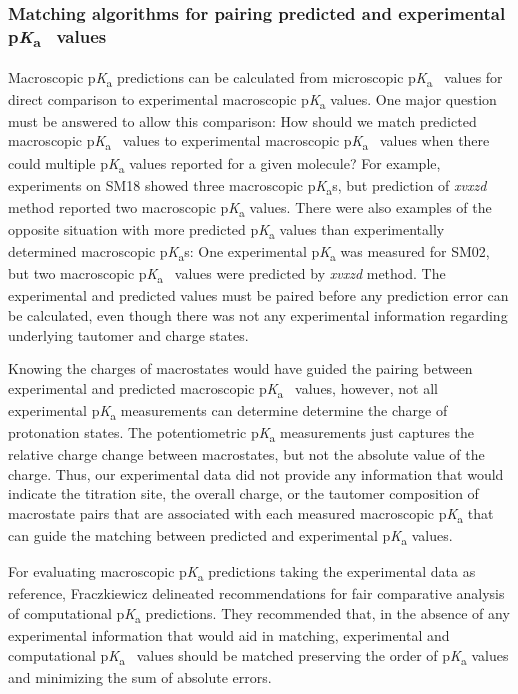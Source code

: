 \documentclass[9pt,lineno,final]{elife}
\newcommand{\pKa}{p\textit{K}\textsubscript{a}}
\begin{document}
\subsubsection{Matching algorithms for pairing predicted and experimental \pKa{}~ values}

Macroscopic \pKa{} predictions can be calculated from microscopic \pKa{}~ values for direct comparison to experimental macroscopic \pKa{} values.
One major question must be answered to allow this comparison:  
How should we match predicted macroscopic \pKa{}~ values to experimental macroscopic \pKa{}~ values when there could multiple \pKa{} values reported for a given molecule?
For example, experiments on SM18 showed three macroscopic \pKa{}s, but prediction of \textit{xvxzd} method reported two macroscopic \pKa{} values. 
There were also examples of the opposite situation with more predicted \pKa{} values than experimentally determined macroscopic \pKa{}s: One experimental \pKa{} was measured for SM02, but two macroscopic \pKa{}~ values were predicted by \textit{xvxzd} method.
The experimental and predicted values must be paired before any prediction error can be calculated, even though there was not any experimental information regarding underlying tautomer and charge states. 

Knowing the charges of macrostates would have guided the pairing between experimental and predicted macroscopic \pKa{}~ values, however, not all experimental \pKa{} measurements can determine determine the charge of protonation states. 
The potentiometric \pKa{} measurements just captures the relative charge change between macrostates, but not the absolute value of the charge.  
Thus, our experimental data did not provide any information that would indicate the titration site, the overall charge, or the tautomer composition of macrostate pairs that are associated with each measured macroscopic \pKa{} that can guide the matching between predicted and experimental \pKa{} values. 
 

For evaluating macroscopic \pKa{} predictions taking the experimental data as reference, Fraczkiewicz \citep{Fraczkiewicz:2013:ReferenceModuleinChemistryMolecularSciencesandChemicalEngineering} delineated recommendations for fair comparative analysis of computational \pKa{} predictions. 
They recommended that, in the absence of any experimental information that would aid in matching, experimental and computational \pKa{}~ values should be matched preserving the order of \pKa{} values and minimizing the sum of absolute errors.
\end{document}
